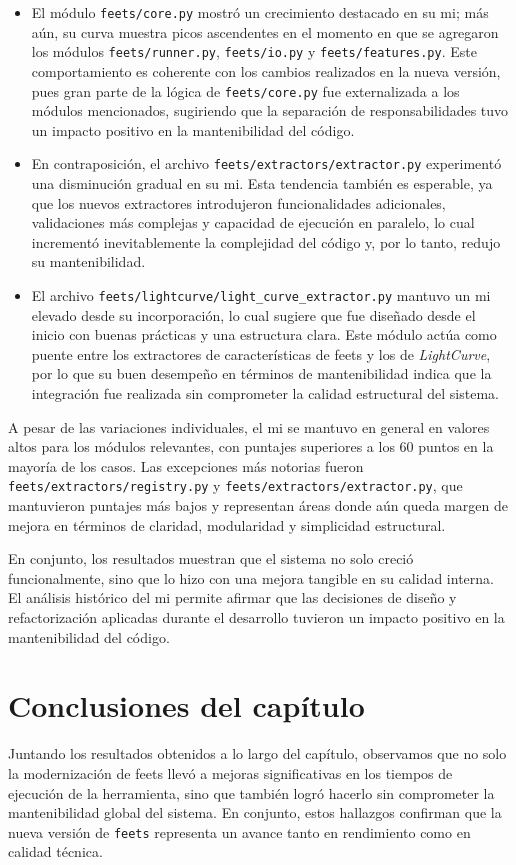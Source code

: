 \begin{itemize}
    \item El módulo \texttt{feets/core.py} mostró un crecimiento destacado en su \gls{mi}; más aún, su curva muestra picos ascendentes en el momento en que se agregaron los módulos \texttt{feets/runner.py}, \texttt{feets/io.py} y \texttt{feets/features.py}. Este comportamiento es coherente con los cambios realizados en la nueva versión, pues gran parte de la lógica de \texttt{feets/core.py} fue externalizada a los módulos mencionados, sugiriendo que la separación de responsabilidades tuvo un impacto positivo en la mantenibilidad del código.

    \item En contraposición, el archivo \texttt{feets/extractors/extractor.py} experimentó una disminución gradual en su \gls{mi}. Esta tendencia también es esperable, ya que los nuevos extractores introdujeron funcionalidades adicionales, validaciones más complejas y capacidad de ejecución en paralelo, lo cual incrementó inevitablemente la complejidad del código y, por lo tanto, redujo su mantenibilidad.

    \item El archivo \texttt{feets/lightcurve/light\_curve\_extractor.py} mantuvo un \gls{mi} elevado desde su incorporación, lo cual sugiere que fue diseñado desde el inicio con buenas prácticas y una estructura clara. Este módulo actúa como puente entre los extractores de características de \gls{feets} y los de \textit{LightCurve}, por lo que su buen desempeño en términos de mantenibilidad indica que la integración fue realizada sin comprometer la calidad estructural del sistema.
\end{itemize}

A pesar de las variaciones individuales, el \gls{mi} se mantuvo en general en valores altos para los módulos relevantes, con puntajes superiores a los 60 puntos en la mayoría de los casos. Las excepciones más notorias fueron \texttt{feets/ex\-trac\-tors/re\-gis\-try.py} y \texttt{feets/extractors/extractor.py}, que mantuvieron puntajes más bajos y representan áreas donde aún queda margen de mejora en términos de claridad, modularidad y simplicidad estructural.

En conjunto, los resultados muestran que el sistema no solo creció funcionalmente, sino que lo hizo con una mejora tangible en su calidad interna. El análisis histórico del \gls{mi} permite afirmar que las decisiones de diseño y refactorización aplicadas durante el desarrollo tuvieron un impacto positivo en la mantenibilidad del código.

\section{Conclusiones del capítulo}

Juntando los resultados obtenidos a lo largo del capítulo, observamos que no solo la modernización de \gls{feets} llevó a mejoras significativas en los tiempos de ejecución de la herramienta, sino que también logró hacerlo sin comprometer la mantenibilidad global del sistema. En conjunto, estos hallazgos confirman que la nueva versión de \texttt{feets} representa un avance tanto en rendimiento como en calidad técnica.
